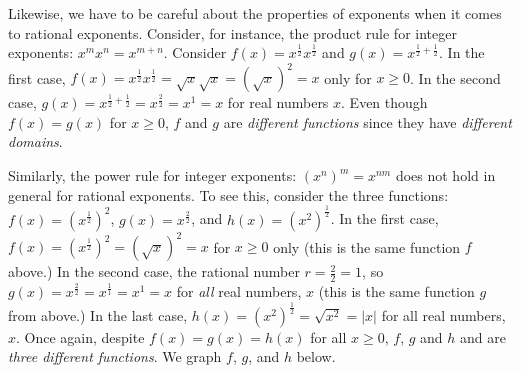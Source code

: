 \documentclass{ximera}
\begin{document}
Likewise, we have to be careful about the properties of exponents when it comes to rational exponents.   Consider, for instance, the product rule for integer exponents:  $x^{m} x^{n} = x^{m+n}$.  Consider $f(x) = x^{\frac{1}{2}} x^{\frac{1}{2}}$ and $g(x) = x^{\frac{1}{2} + \frac{1}{2}}$.  In the first case, $f(x) =  x^{\frac{1}{2}} x^{\frac{1}{2}} =\sqrt{x} \sqrt{x} = (\sqrt{x})^2 = x$ only for $x \geq 0$.   In the second case, $g(x) = x^{\frac{1}{2} + \frac{1}{2}} = x^{\frac{2}{2}} = x^{1} = x$ for  real numbers $x$. Even though $f(x) = g(x)$ for $x \geq 0$, $f$ and $g$ are \textit{different functions} since they have \textit{different domains}.  


Similarly,  the power rule for integer exponents:  $(x^n)^m = x^{nm}$ does not hold  in general for rational exponents. To see this,  consider the three functions: $f(x) = (x^{\frac{1}{2}} )^2$,  $g(x) = x^{\frac{2}{2}}$,  and $h(x) = (x^2)^{\frac{1}{2}}$. In the first case,  $f(x) = (x^{\frac{1}{2}})^2 = (\sqrt{x})^2 = x$ for $x \geq 0$ only (this is the same function $f$ above.)  In the second case,  the rational number $r = \frac{2}{2} = 1$, so $g(x) = x^{\frac{2}{2}} = x^{\frac{1}{1}} = x^{1} = x$ for \textit{all} real numbers, $x$ (this is the same function $g$ from above.)  In the last case,  $h(x) = (x^2)^{\frac{1}{2}} = \sqrt{x^2} = |x|$ for all real numbers, $x$. Once again, despite $f(x) = g(x) = h(x)$ for all $x \geq 0$,  $f$, $g$ and $h$ and are \textit{three different functions}.  We graph $f$, $g$, and $h$ below.  
\end{document}
